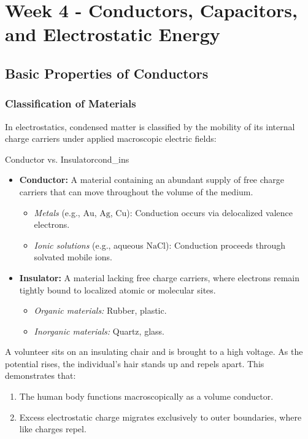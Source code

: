 \section{Week 4 - Conductors, Capacitors, and Electrostatic Energy}

\subsection{Basic Properties of Conductors}

\subsubsection{Classification of Materials}

In electrostatics, condensed matter is classified by the mobility of its internal charge carriers under applied macroscopic electric fields:

\begin{definition}{Conductor vs. Insulator}{cond_ins}
    \begin{itemize}
        \item \textbf{Conductor:} A material containing an abundant supply of free charge carriers that can move throughout the volume of the medium.
        \begin{itemize}
            \item \emph{Metals} (e.g., \(\mathrm{Au}\), \(\mathrm{Ag}\), \(\mathrm{Cu}\)): Conduction occurs via delocalized valence electrons.
            \item \emph{Ionic solutions} (e.g., aqueous \(\mathrm{NaCl}\)): Conduction proceeds through solvated mobile ions.
        \end{itemize}
        \item \textbf{Insulator:} A material lacking free charge carriers, where electrons remain tightly bound to localized atomic or molecular sites.
        \begin{itemize}
            \item \emph{Organic materials:} Rubber, plastic.
            \item \emph{Inorganic materials:} Quartz, glass.
        \end{itemize}
    \end{itemize}
\end{definition}

\begin{remark}
    A volunteer sits on an insulating chair and is brought to a high voltage. As the potential rises, the individual's hair stands up and repels apart. This demonstrates that:
    \begin{enumerate}
        \item The human body functions macroscopically as a volume conductor.
        \item Excess electrostatic charge migrates exclusively to outer boundaries, where like charges repel.
    \end{enumerate}
\end{remark}

